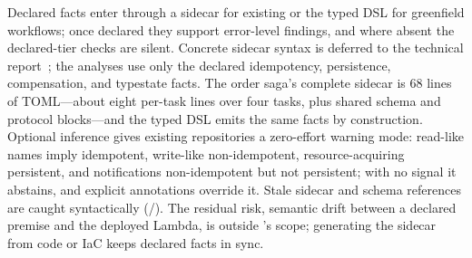 Declared facts enter through a sidecar for existing \asl{} or the typed DSL for greenfield workflows;
once declared they support error-level findings, and where absent the declared-tier checks are
silent.
Concrete sidecar syntax is deferred to the technical report~\cite{stepcheck-repo}; the analyses
use only the declared idempotency, persistence, compensation, and typestate facts.
The order saga's complete sidecar is 68 lines of TOML---about eight per-task lines over four tasks,
plus shared schema and protocol blocks---and the typed DSL emits the same facts by construction.
Optional inference gives existing repositories a zero-effort warning mode: read-like names imply
idempotent, write-like non-idempotent, resource-acquiring persistent, and notifications
non-idempotent but not persistent; with no signal it abstains, and explicit annotations override it.
Stale sidecar and schema references are caught syntactically (/). The
residual risk, semantic drift between a declared premise and the deployed Lambda, is outside
\tool{}'s scope; generating the sidecar from code or IaC keeps declared facts in sync.

